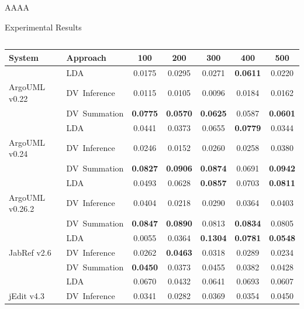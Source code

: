 \documentclass[final]{beamer} %
\begin{document}
\begin{frame}
\begin{beamercolorbox}[center]{AAAA}
\begin{minipage}[T]{.97\textwidth}
\begin{block}{Experimental Results}
        \hfill
        \begin{columns}
        \begin{column}{0.45\textwidth}
          \vspace{2.95cm}
          \begin{tabular}{llccccc}
            \hline
            {\bf System} & {\bf Approach} & {\bf 100} & {\bf 200} & {\bf 300} & {\bf 400} & {\bf 500}         \\
            \hline
            & LDA           & 0.0175       & 0.0295       & 0.0271       & {\bf 0.0611} & 0.0220       \\
            ArgoUML v0.22      & DV\ Inference & 0.0115       & 0.0105       & 0.0096       & 0.0184       & 0.0162       \\
            & DV\ Summation & {\bf 0.0775} & {\bf 0.0570} & {\bf 0.0625} & 0.0587       & {\bf 0.0601} \\
            \hline
            & LDA           & 0.0441       & 0.0373       & 0.0655       & {\bf 0.0779} & 0.0344       \\
            ArgoUML v0.24      & DV\ Inference & 0.0246       & 0.0152       & 0.0260       & 0.0258       & 0.0380       \\
            & DV\ Summation & {\bf 0.0827} & {\bf 0.0906} & {\bf 0.0874} & 0.0691       & {\bf 0.0942} \\
            \hline
            & LDA           & 0.0493       & 0.0628       & {\bf 0.0857} & 0.0703       & {\bf 0.0811} \\
            ArgoUML v0.26.2    & DV\ Inference & 0.0404       & 0.0218       & 0.0290       & 0.0364       & 0.0403       \\
            & DV\ Summation & {\bf 0.0847} & {\bf 0.0890} & 0.0813       & {\bf 0.0834} & 0.0805       \\
            \hline
            & LDA           & 0.0055       & 0.0364       & {\bf 0.1304} & {\bf 0.0781} & {\bf 0.0548} \\
            JabRef v2.6        & DV\ Inference & 0.0262       & {\bf 0.0463} & 0.0318       & 0.0289       & 0.0234       \\
            & DV\ Summation & {\bf 0.0450} & 0.0373       & 0.0455       & 0.0382       & 0.0428       \\
            \hline
            & LDA           & 0.0670       & 0.0432       & 0.0641       & 0.0693       & 0.0607       \\
            jEdit v4.3         & DV\ Inference & 0.0341       & 0.0282       & 0.0369       & 0.0354       & 0.0450       \\

\end{tabular}
\end{column}
\end{columns}
\end{block}
\end{minipage}
\end{beamercolorbox}
\end{frame}
\end{document}
